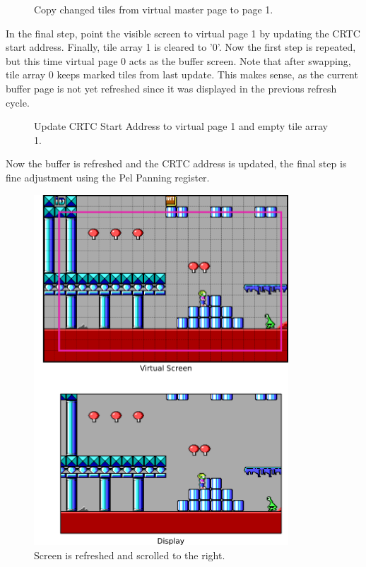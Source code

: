 \documentclass[book.tex]{subfiles}
\begin{document}
\begin{figure}[H]
\centering
 \caption{Copy changed tiles from virtual master page to page 1.}
 \label{fig:kc1_3_step2}
\end{figure}


\pagebreak
In the final step, point the visible screen to virtual page 1 by updating the CRTC start address. Finally, tile array 1 is cleared to '0'. Now the first step is repeated, but this time virtual page 0 acts as the buffer screen. Note that after swapping, tile array 0 keeps marked tiles from last update. This makes sense, as the current buffer page is not yet refreshed since it was displayed in the previous refresh cycle. 

\begin{figure}[H]
\centering
 \caption{Update CRTC Start Address to virtual page 1 and empty tile array 1.}
 \label{fig:kc1_3_step2}
\end{figure}

\pagebreak

Now the buffer is refreshed and the CRTC address is updated, the final step is fine adjustment using the Pel Panning register.
\begin{figure}[H]
\centering
 \includegraphics[width=0.85\textwidth]{screenshots_300dpi/game/Keen_ATR_1-3_b.png}
 \caption{Screen is refreshed and scrolled to the right.}
 \label{fig:kc1_3_start}
\end{figure}
\end{document}
